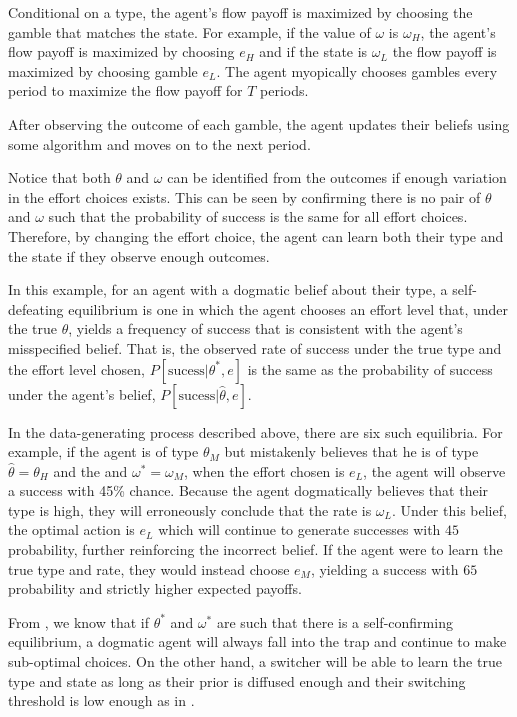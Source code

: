 \documentclass[
  12pt,
]{article}
\begin{document}
Conditional on a type, the agent's flow payoff is maximized by choosing
the gamble that matches the state. For example, if the value of
\(\omega\) is \(\omega_H\), the agent's flow payoff is maximized by
choosing \(e_H\) and if the state is \(\omega_L\) the flow payoff is
maximized by choosing gamble \(e_L\). The agent myopically chooses
gambles every period to maximize the flow payoff for \(T\) periods.

After observing the outcome of each gamble, the agent updates their
beliefs using some algorithm and moves on to the next period.

Notice that both \(\theta\) and \(\omega\) can be identified from the
outcomes if enough variation in the effort choices exists. This can be
seen by confirming there is no pair of \(\theta\) and \(\omega\) such
that the probability of success is the same for all effort choices.
Therefore, by changing the effort choice, the agent can learn both their
type and the state if they observe enough outcomes.

In this example, for an agent with a dogmatic belief about their type, a
self-defeating equilibrium is one in which the agent chooses an effort
level that, under the true \(\theta\), yields a frequency of success
that is consistent with the agent's misspecified belief. That is, the
observed rate of success under the true type and the effort level
chosen, \(P[\text{sucess}|\theta^*, e]\) is the same as the probability
of success under the agent's belief,
\(P[\text{sucess}|\hat{\theta}, e]\).

In the data-generating process described above, there are six such
equilibria. For example, if the agent is of type \(\theta_M\) but
mistakenly believes that he is of type \(\hat{\theta}=\theta_H\) and the
and \(\omega^* = \omega_M\), when the effort chosen is \(e_L\), the
agent will observe a success with 45\% chance. Because the agent
dogmatically believes that their type is high, they will erroneously
conclude that the rate is \(\omega_L\). Under this belief, the optimal
action is \(e_L\) which will continue to generate successes with \(45%
\) probability, further reinforcing the incorrect belief. If the agent
were to learn the true type and rate, they would instead choose \(e_M\),
yielding a success with \(65%
\) probability and strictly higher expected payoffs.

From \citet{Heidhues2018}, we know that if \(\theta^*\) and \(\omega^*\)
are such that there is a self-confirming equilibrium, a dogmatic agent
will always fall into the trap and continue to make sub-optimal choices.
On the other hand, a switcher will be able to learn the true type and
state as long as their prior is diffused enough and their switching
threshold is low enough as in \citet{Ba2023}.
\end{document}
